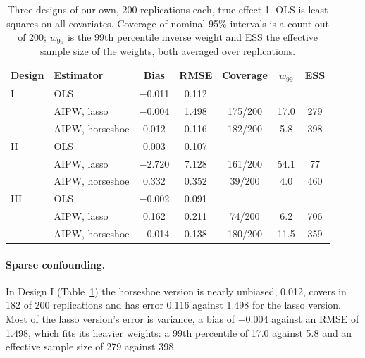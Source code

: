 \begin{table}[ht]
\centering
\caption{Three designs of our own, 200 replications each, true effect 1. OLS is least squares on all covariates. Coverage of nominal 95\% intervals is a count out of 200; $w_{99}$ is the 99th percentile inverse weight and ESS the effective sample size of the weights, both averaged over replications.}
\label{tab:baipw}
\scriptsize
\setlength{\tabcolsep}{3pt}
\begin{tabular}{llccccc}
\toprule
Design & Estimator & Bias & RMSE & Coverage & $w_{99}$ & ESS \\
\midrule
I & OLS & $-$0.011 & 0.112 & & & \\
 & AIPW, lasso & $-$0.004 & 1.498 & 175/200 & 17.0 & 279 \\
 & AIPW, horseshoe & 0.012 & 0.116 & 182/200 & 5.8 & 398 \\
\midrule
II & OLS & 0.003 & 0.107 & & & \\
 & AIPW, lasso & $-$2.720 & 7.128 & 161/200 & 54.1 & 77 \\
 & AIPW, horseshoe & 0.332 & 0.352 & 39/200 & 4.0 & 460 \\
\midrule
III & OLS & $-$0.002 & 0.091 & & & \\
 & AIPW, lasso & 0.162 & 0.211 & 74/200 & 6.2 & 706 \\
 & AIPW, horseshoe & $-$0.014 & 0.138 & 180/200 & 11.5 & 359 \\
\bottomrule
\end{tabular}
\end{table}

\paragraph{Sparse confounding.} In Design I (Table~\ref{tab:baipw}) the horseshoe version is nearly unbiased, 0.012, covers in 182 of 200 replications and has error 0.116 against 1.498 for the lasso version. Most of the lasso version's error is variance, a bias of $-$0.004 against an RMSE of 1.498, which fits its heavier weights: a 99th percentile of 17.0 against 5.8 and an effective sample size of 279 against 398.

